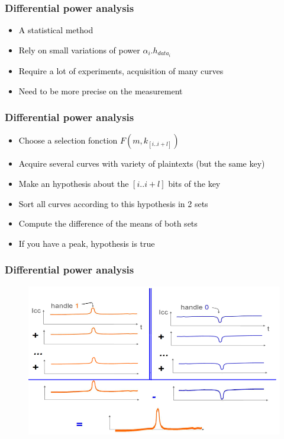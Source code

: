 \documentclass{beamer}
\begin{document}
\begin{frame}
    \frametitle{Differential power analysis}
    \begin{itemize}
	\item \textcolor{black} {A statistical method}
        \item \textcolor{black} {Rely on small variations of power $\alpha_{i}. h_{data_{i}}$}
	\item \textcolor{black} {Require a lot of experiments, acquisition of many curves}
	\item \textcolor{black} {Need to be more precise on the measurement}
    \end{itemize}
\end{frame}

\begin{frame}
    \frametitle{Differential power analysis}
    \begin{itemize}
        \item \textcolor{black} {Choose a selection fonction $F(m, k_{[i..i+l]})$}
	\item \textcolor{black} {Acquire several curves with variety of plaintexts (but the same key)}
	\item \textcolor{black} {Make an hypothesis about the $[i..i+l]$ bits of the key}
	\item \textcolor{black} {Sort all curves according to this hypothesis in 2 sets}
	\item \textcolor{black} {Compute the difference of the means of both sets}
	\item \textcolor{black} {If you have a peak, hypothesis is true}
    \end{itemize}
\end{frame}

\begin{frame}
    \frametitle{Differential power analysis}
    \begin{figure}
        \centering
        \includegraphics[scale=0.5]{img/dpa.png}
    \end{figure}
\end{frame}
\end{document}
